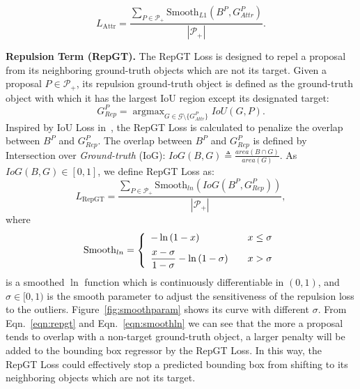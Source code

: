 \documentclass[10pt,twocolumn,letterpaper]{article}
\newcommand{\myparagraph}[1]{{\vspace{0.5em} \noindent \bf #1}}
\begin{document}
\begin{equation}
L_\mathrm{Attr} = \frac{\sum_{P \in \mathcal{P_+}} \mathrm{Smooth}_{L1}(B^P, G_{Attr}^{P})}{|\mathcal{P_+}|}.
\label{eqn:attr}
\end{equation}

\myparagraph{Repulsion Term (RepGT).} The RepGT Loss is designed to repel a proposal from its neighboring ground-truth objects which are not its target. Given a proposal $P \in \mathcal{P_+}$, its repulsion ground-truth object is defined as the ground-truth object with which it has the largest IoU region except its designated target:
\begin{equation}
G_{Rep}^P = \mathop{\arg\max}_{G \in \mathcal{G}\setminus\{G_{Attr}^P\}} IoU(G, P).
\end{equation}
Inspired by IoU Loss in~\cite{yu2016unitbox}, the RepGT Loss is calculated to penalize the overlap between $B^P$ and $G_{Rep}^P$.  The overlap between $B^P$ and $G_{Rep}^P$ is defined by Intersection over {\it Ground-truth} (IoG): $IoG(B, G) \triangleq \frac{area(B \cap G)}{area(G)}$. As $IoG(B, G) \in [0,1]$, we define RepGT Loss as:
\begin{equation}
L_\mathrm{RepGT} = \frac{\sum_{P \in \mathcal{P_+}} \mathrm{Smooth}_{ln}\left(IoG(B^P, G_{Rep}^P)\right)}{|\mathcal{P_+}|},
\label{eqn:repgt}
\end{equation}
where
\begin{equation}
\mathrm{Smooth}_{ln} = \left \{
\begin{array}{lr}
    \vspace{0.2cm}
    -\ln{(1-x)}  \quad & x \leq \sigma \\
    \dfrac{x-\sigma}{1-\sigma} - \ln{(1-\sigma)} \quad & x > \sigma \\
\end{array}
\right.
\label{eqn:smoothln}
\end{equation}
is a smoothed $\ln$ function which is continuously differentiable in $(0,1)$, and $\sigma \in [0,1)$ is the smooth parameter to adjust the sensitiveness of the repulsion loss to the outliers. Figure~\ref{fig:smoothparam} shows its curve with different $\sigma$. From Eqn.~\ref{eqn:repgt} and Eqn.~\ref{eqn:smoothln} we can see that the more a proposal tends to overlap with a non-target ground-truth object, a larger penalty will be added to the bounding box regressor by the RepGT Loss. In this way, the RepGT Loss could effectively stop a predicted bounding box from shifting to its neighboring objects which are not its target.
\end{document}

